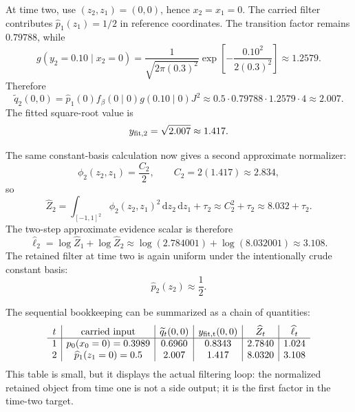 \documentclass[11pt]{article}
\numberwithin{equation}{section}
\newcommand{\dd}{\,\mathrm d}
\newcommand{\widehatell}{\widehat\ell}
\begin{document}
At time two, use \((z_2,z_1)=(0,0)\), hence \(x_2=x_1=0\).  The carried
filter contributes \(\widehat p_1(z_1)=1/2\) in reference coordinates.  The
transition factor remains \(0.79788\), while
\begin{equation}
    g(y_2=0.10\mid x_2=0)
    =
    \frac{1}{\sqrt{2\pi(0.3)^2}}
    \exp\!\left[-\frac{0.10^2}{2(0.3)^2}\right]
    \approx1.2579.
    \label{eq:p24-trace-density3}
\end{equation}
Therefore
\begin{equation}
    \widetilde q_2(0,0)
    =
    \widehat p_1(0)f_\beta(0\mid0)g(0.10\mid0)J^2
    \approx
    0.5\cdot0.79788\cdot1.2579\cdot4
    \approx2.007.
    \label{eq:p24-trace-q2}
\end{equation}
The fitted square-root value is
\begin{equation}
    y_{\rm fit,2}=\sqrt{2.007}\approx1.417.
    \label{eq:p24-trace-root2}
\end{equation}

The same constant-basis calculation now gives a second approximate
normalizer:
\begin{equation}
    \phi_2(z_2,z_1)=\frac{C_2}{2},
    \qquad
    C_2=2(1.417)\approx2.834,
    \label{eq:p26-trace-seq-1}
\end{equation}
so
\begin{equation}
    \widehat Z_2
    =
    \int_{[-1,1]^2}\phi_2(z_2,z_1)^2\dd z_2\dd z_1+\tau_2
    \approx
    C_2^2+\tau_2
    \approx
    8.032+\tau_2.
    \label{eq:p26-trace-seq-2}
\end{equation}
The two-step approximate evidence scalar is therefore
\begin{equation}
    \widehatell_2
    =
    \log \widehat Z_1+\log \widehat Z_2
    \approx
    \log(2.784001)+\log(8.032001)
    \approx
    3.108.
    \label{eq:p26-trace-seq-3}
\end{equation}
The retained filter at time two is again uniform under the intentionally crude
constant basis:
\begin{equation}
    \widehat p_2(z_2)\approx \frac12.
    \label{eq:p26-trace-seq-4}
\end{equation}

The sequential bookkeeping can be summarized as a chain of quantities:
\begin{equation}
\begin{array}{c|c|c|c|c|c}
t & \text{carried input} & \widetilde q_t(0,0)
& y_{\rm fit,t}(0,0) & \widehat Z_t & \widehatell_t\\
\hline
1 & p_0(x_0=0)=0.3989 & 0.6960 & 0.8343 & 2.7840 & 1.024\\
2 & \widehat p_1(z_1=0)=0.5 & 2.007 & 1.417 & 8.0320 & 3.108
\end{array}
    \label{eq:p26-trace-seq-5}
\end{equation}
This table is small, but it displays the actual filtering loop: the normalized
retained object from time one is not a side output; it is the first factor in
the time-two target.
\end{document}
